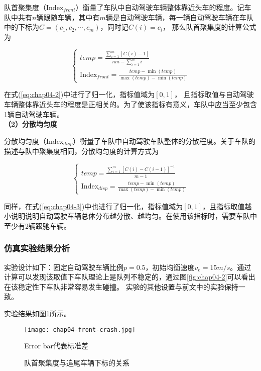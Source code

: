 队首聚集度（$\mathrm{Index}_{front}$）衡量了车队中自动驾驶车辆整体靠近头车的程度。记车队中共有$n$辆跟随车辆，其中有$m$辆是自动驾驶车辆，每一辆自动驾驶车辆在车队中的下标为$C = (c_1, c_2, \cdots, c_m)$，同时记$C(i) = c_i$，
那么队首聚集度的计算公式为

\begin{equation}
    \begin{cases}
      temp = \frac{\sum_{i=1}^{m}[C(i) - 1 ]}{nm - \sum_{i=1}^{m}i} \\
      \mathrm{Index}_{front} = \frac{temp - \min(temp)}{\max(temp) - \min(temp)}
    \end{cases}
    \label{eq:chap04-2}
\end{equation}

在式(\ref{eq:chap04-2})中进行了归一化，指标值域为$[0,1]$，
且指标取值与自动驾驶车辆整体靠近头车的程度是正相关的。为了使该指标有意义，车队中应当至少包含1辆自动驾驶车辆。 \\

\noindent \textbf{（2）分散均匀度}

分散均匀度（$\mathrm{Index}_{disp}$）衡量了车队中自动驾驶车队整体的分散程度。关于车队的描述与队中聚集度相同，分散均匀度的计算方式为

\begin{equation}
    \begin{cases}
      temp = \frac{\sum_{i=1}^m [C(i)-C(i-1)]^{-1}}{m-1} \\
      \mathrm{Index}_{disp} = \frac{temp - \min(temp)}{\max(temp) - \min(temp)}
    \end{cases}
    \label{eq:chap04-3}
\end{equation}

同样，在式(\ref{eq:chap04-3})中也进行了归一化，指标值域为$[0,1]$，且指标取值越小说明说明自动驾驶车辆总体分布越分散、越均匀。在使用该指标时，需要车队中至少有2辆跟驰车辆。

\subsubsection{仿真实验结果分析}

实验设计如下：固定自动驾驶车辆比例$p=0.5$，初始均衡速度$v_e = 15m/s$。通过计算可以发现该取值下车队理论上是队列不稳定的，通过图\ref{fig:chap04-2}可以看出在该稳定性下车队非常容易发生碰撞。
实验的其他设置与前文中的实验保持一致。

实验结果如图\ref{fig:chap04-5}所示。

\begin{figure}
    \centering
    \texttt{[image: chap04-front-crash.jpg]}
    \caption*{Error bar代表标准差}
    \caption{队首聚集度与追尾车辆下标的关系}
    \label{fig:chap04-5}
\end{figure} 

